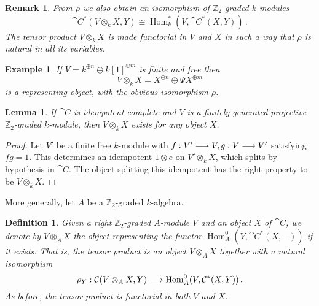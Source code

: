 \documentclass[english,letter paper,12pt,leqno]{article}
\newtheorem{lemma}[theorem]{Lemma}
\theoremstyle{example}
\newtheorem{definition}[theorem]{Definition}
\newtheorem{example}[theorem]{Example}
\newtheorem{remark}[theorem]{Remark}
\numberwithin{equation}{section}
\def\Hom{\operatorname{Hom}}
\begin{document}
\begin{remark} 
From $\rho$ we also obtain an isomorphism of $\mathbb{Z}_2$-graded $k$-modules
\[
\cat{C}^*( V \otimes_k X, Y ) \cong \Hom_k^*( V, \cat{C}^*(X,Y) )\,.
\]
The tensor product $V \otimes_k X$ is made functorial in $V$ and $X$ in such a way that $\rho$ is natural in all its variables.
\end{remark}

\begin{example} If $V = k^{\oplus n} \oplus k[1]^{\oplus m}$ is finite and free then
\[
V \otimes_k X = X^{\oplus n} \oplus \Psi X ^{\oplus m}
\]
is a representing object, with the obvious isomorphism $\rho$.
\end{example}

\begin{lemma} If $\cat{C}$ is idempotent complete and $V$ is a finitely generated projective $\mathbb{Z}_2$-graded $k$-module, then $V \otimes_k X$ exists for any object $X$.
\end{lemma}
\begin{proof}
Let $V'$ be a finite free $k$-module with $f: V' \longrightarrow V, g: V \longrightarrow V'$ satisfying $fg = 1$. This determines an idempotent $1 \otimes e$ on $V' \otimes_k X$, which splits by hypothesis in $\cat{C}$. The object splitting this idempotent has the right property to be $V \otimes_k X$.
\end{proof}

More generally, let $A$ be a $\mathbb{Z}_2$-graded $k$-algebra.

\begin{definition} Given a right $\mathbb{Z}_2$-graded $A$-module $V$ and an object $X$ of $\cat{C}$, we denote by $V \otimes_A X$ the object representing the functor $\Hom^0_A( V, \cat{C}^*(X,-))$ if it exists. That is, the tensor product is an object $V \otimes_A X$ together with a natural isomorphism
\begin{equation}\label{eq:isodefatensor}
\rho_Y: \cat{C}(V \otimes_A X, Y) \lto \Hom^0_A( V, \cat{C}^*(X,Y))\,.
\end{equation}
As before, the tensor product is functorial in both $V$ and $X$.
\end{definition}
\end{document}
